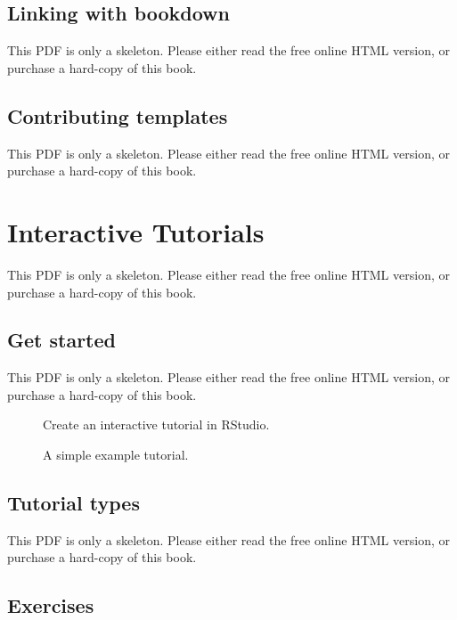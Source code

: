 \documentclass[
  11pt,
]{krantz}
\theoremstyle{definition}
\theoremstyle{definition}
\theoremstyle{definition}
\theoremstyle{definition}
\theoremstyle{remark}
\begin{document}
\section{Linking with bookdown}\label{rticles-bookdown}

This PDF is only a skeleton. Please either read the free online HTML version, or purchase a hard-copy of this book.

\section{Contributing templates}\label{rticles-contrib}

This PDF is only a skeleton. Please either read the free online HTML version, or purchase a hard-copy of this book.

\chapter{Interactive Tutorials}\label{learnr}

This PDF is only a skeleton. Please either read the free online HTML version, or purchase a hard-copy of this book.

\section{Get started}\label{learnr-start}

This PDF is only a skeleton. Please either read the free online HTML version, or purchase a hard-copy of this book.

\begin{figure}\caption{Create an interactive tutorial in RStudio.}\end{figure}

\begin{figure}\caption{A simple example tutorial.}\end{figure}

\section{Tutorial types}\label{learnr-types}

This PDF is only a skeleton. Please either read the free online HTML version, or purchase a hard-copy of this book.

\section{Exercises}\label{learnr-exercises}
\end{document}
